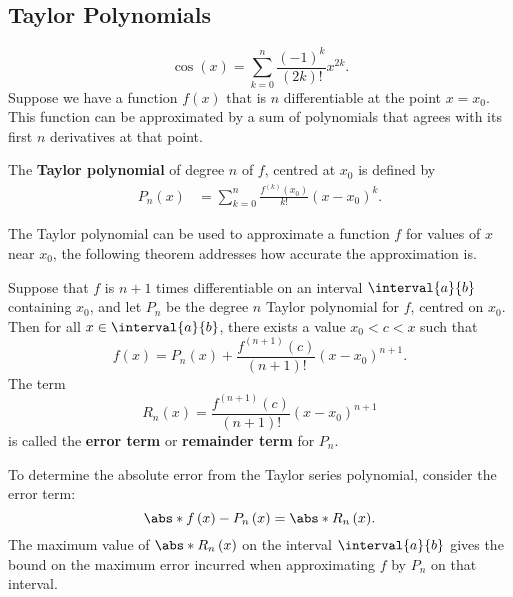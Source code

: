 \documentclass{article}
\begin{document}
\subsection{Taylor Polynomials}
\begin{equation*}
    \cos{\left( x \right)} = \sum_{k = 0}^n \frac{\left( -1 \right)^k}{\left(2k \right)!} x^{2k}.
\end{equation*}
Suppose we have a function \(f\left( x \right)\) that is \(n\) differentiable at the point
\(x = x_0\). This function can be approximated by a sum of polynomials that agrees with its first \(n\) derivatives at that point.
\begin{definition}
    The \textbf{Taylor polynomial} of degree \(n\) of \(f\), centred at \(x_0\) is defined by
    \begin{align*}
        P_n\left( x \right) & = \sum_{k = 0}^n \frac{f^{\left( k \right)}\left( x_0 \right)}{k!} \left( x - x_0 \right)^k.
    \end{align*}
\end{definition}
The Taylor polynomial can be used to approximate a function \(f\) for values of \(x\) near \(x_0\), the following
theorem addresses how accurate the approximation is.
\begin{definition}
    Suppose that \(f\) is \(n + 1\) times differentiable on an interval \(\interval{a}{b}\) containing \(x_0\),
    and let \(P_n\) be the degree \(n\) Taylor polynomial for \(f\), centred on \(x_0\). Then for all \(x \in \interval{a}{b}\),
    there exists a value \(x_0 < c < x\) such that
    \begin{equation*}
        f\left( x \right) = P_n\left( x \right) + \frac{f^{\left( n + 1 \right)}\left( c \right)}{\left( n + 1 \right)!} \left( x - x_0 \right)^{n + 1}.
    \end{equation*}
    The term
    \begin{equation*}
        R_n\left( x \right) = \frac{f^{\left( n + 1 \right)}\left( c \right)}{\left( n + 1 \right)!} \left( x - x_0 \right)^{n + 1}
    \end{equation*}
    is called the \textbf{error term} or \textbf{remainder term} for \(P_n\).
\end{definition}
To determine the absolute error from the Taylor series polynomial, consider the error term:
\begin{equation*}
    \abs*{f\left( x \right) - P_n\left( x \right)} = \abs*{R_n\left( x \right)}.
\end{equation*}
The maximum value of \(\abs*{R_n\left( x \right)}\) on the interval \(\interval{a}{b}\) gives the bound on the maximum error incurred when approximating
\(f\) by \(P_n\) on that interval.
\end{document}
